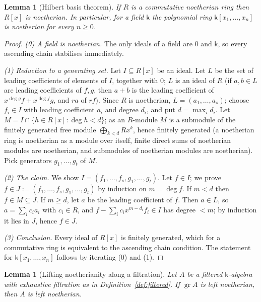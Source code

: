 \documentclass[11pt]{ctexart}
\theoremstyle{plain}
\newtheorem{lemma}[theorem]{Lemma}
\theoremstyle{definition}
\theoremstyle{remark}
\newcommand{\kk}{\mathsf{k}}
\begin{document}
\begin{lemma}[Hilbert basis theorem]\label{lem:hilbert}
If $R$ is a commutative noetherian ring then $R[x]$ is noetherian. In particular,
for a field $\kk$ the polynomial ring $\kk[x_1,\dots,x_n]$ is noetherian for every
$n\ge0$.
\end{lemma}

\begin{proof}
\emph{(0) A field is noetherian.} The only ideals of a field are $0$ and $\kk$, so
every ascending chain stabilises immediately.

\emph{(1) Reduction to a generating set.} Let $I\subseteq R[x]$ be an ideal. Let $L$
be the set of leading coefficients of elements of $I$, together with $0$; $L$ is an
ideal of $R$ (if $a,b\in L$ are leading coefficients of $f,g$, then $a+b$ is the
leading coefficient of $x^{\deg g}f+x^{\deg f}g$, and $ra$ of $rf$). Since $R$ is
noetherian, $L=(a_1,\dots,a_s)$; choose $f_i\in I$ with leading coefficient $a_i$
and degree $d_i$, and put $d=\max_i d_i$. Let
$M=I\cap\{h\in R[x]:\deg h<d\}$; as an $R$-module $M$ is a submodule of the finitely
generated free module $\bigoplus_{k<d}Rx^k$, hence finitely generated (a noetherian
ring is noetherian as a module over itself, finite direct sums of noetherian modules
are noetherian, and submodules of noetherian modules are noetherian). Pick
generators $g_1,\dots,g_t$ of $M$.

\emph{(2) The claim.} We show $I=(f_1,\dots,f_s,g_1,\dots,g_t)$. Let $f\in I$; we
prove $f\in J:=(f_1,\dots,f_s,g_1,\dots,g_t)$ by induction on $m=\deg f$. If
$m<d$ then $f\in M\subseteq J$. If $m\ge d$, let $a$ be the leading coefficient of
$f$. Then $a\in L$, so $a=\sum_i c_i a_i$ with $c_i\in R$, and
$f-\sum_i c_i x^{m-d_i}f_i\in I$ has degree $<m$; by induction it lies in $J$, hence
$f\in J$.

\emph{(3) Conclusion.} Every ideal of $R[x]$ is finitely generated, which for a
commutative ring is equivalent to the ascending chain condition. The statement for
$\kk[x_1,\dots,x_n]$ follows by iterating (0) and (1).
\end{proof}

\begin{lemma}[Lifting noetherianity along a filtration]\label{lem:lift}
Let $A$ be a filtered $\kk$-algebra with exhaustive filtration as in
Definition~\ref{def:filtered}. If $\operatorname{gr}A$ is left noetherian, then $A$
is left noetherian.
\end{lemma}
\end{document}
